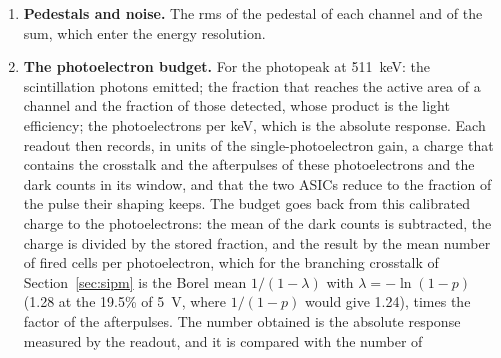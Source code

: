 \documentclass[11pt]{article}
\begin{document}
\begin{enumerate}
  The peaks are usable only at a short shaping of the high gain, where the
  dark pulses do not pile up under the held value. With the pulse and
  noise of the model, the Radioroc2 calibrates every channel at 50 and
  100~ns (the fitted gains scatter by 3.6\% between channels at 100~ns, the
  setting adopted) but not at 300~ns or at 25~ns, where the noise hides
  the peaks; the Citiroc calibrates every channel at 25, 50 and 87.5~ns,
  with a scatter of 2.2, 5.1 and 7.5\%, and its high gain is set to 25~ns
  while the low gain stays at 87.5~ns for the energy. The gain of the low-gain path follows
  from the ratio of the two paths at their two peaking times, which the
  charge-injection input of each chip measures (the Citiroc has one on
  each preamplifier, the Radioroc2 a 1.5~pF capacitor per channel). The
  simulation assumes this ratio known. The injected charge arrives at once,
  while the charge of an avalanche is spread over the 100~ns of its pulse,
  so that at a short shaping the high gain responds less to an avalanche
  than to the same injected charge; the ratio measured by injection has to
  be corrected for this with the pulse shape. The 1275 to 511 ratio of the
  low-gain sum then tests the linearity of that path alone.
\item {\bf Pedestals and noise.} The rms of the pedestal of each channel
  and of the sum, which enter the energy resolution.
\item {\bf The photoelectron budget.} For the photopeak at 511~keV: the
  scintillation photons emitted; the fraction that reaches the active area
  of a channel and the fraction of those detected, whose product is the
  light efficiency; the photoelectrons per keV, which is the absolute
  response. Each readout then records, in units of the single-photoelectron
  gain, a charge that contains the crosstalk and the afterpulses of these
  photoelectrons and the dark counts in its window, and that the two ASICs
  reduce to the fraction of the pulse their shaping keeps. The budget goes
  back from this calibrated charge to the photoelectrons: the mean of the
  dark counts is subtracted, the charge is divided by the stored fraction,
  and the result by the mean number of fired cells per photoelectron, which
  for the branching crosstalk of Section~\ref{sec:sipm} is the Borel mean
  $1/(1-\lambda)$ with $\lambda = -\ln(1-p)$ (1.28 at the 19.5\% of 5~V,
  where $1/(1-p)$ would give 1.24), times the
  factor of the afterpulses. The number obtained is the absolute response
  measured by the readout, and it is compared with the number of

\end{enumerate}
\end{document}
